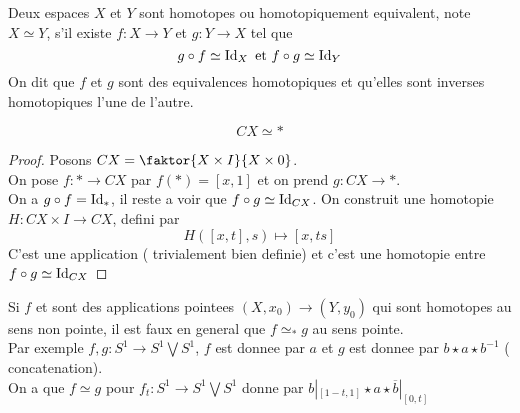 \documentclass[../main.tex]{subfiles}
\begin{document}
\begin{defn}
	Deux espaces $X$ et $Y$ sont homotopes ou homotopiquement equivalent, note $X\simeq Y$, s'il existe $f:X\to Y$ et $g:Y\to X$ tel que
	\[ 
	g\circ f \simeq \operatorname{Id}_X \text{ et } f\circ g \simeq \operatorname{Id}_Y
	\]
	On dit que $f$ et $g$ sont des equivalences homotopiques et qu'elles sont inverses homotopiques l'une de l'autre.
\end{defn}
\begin{propo}
\[ 
CX\simeq \ast
\]

\end{propo}
\begin{proof}
Posons $CX = \faktor { X\times I} { X\times 0} $.\\
On pose $f: \ast \to CX$ par $f( \ast) = [ x,1] $ et on prend $g:CX\to \ast$.\\
On a $g\circ f=\operatorname{Id}_\ast$, il reste a voir que $f\circ g\simeq \operatorname{Id}_{CX} $. On construit une homotopie $H:CX\times I\to CX$, defini par
\[ 
H( [ x,t] ,s) \mapsto [ x,ts] 
\]
C'est une application ( trivialement bien definie) et c'est une homotopie entre $f\circ g\simeq \operatorname{Id}_{CX} $ 
\end{proof}

\begin{rmq}
Si $f$ et sont des applications pointees $( X,x_0) \to ( Y,y_0) $ qui sont homotopes au sens non pointe, il est faux en general que $f\simeq_{\ast} g$ au sens pointe.\\
Par exemple $f,g: S^1\to S^1\bigvee S^1$, $f$ est donnee par $a$ et $g$ est donnee par $b\star a\star b^{-1}$ ( concatenation).\\
On a que $f\simeq g$ pour $f_t: S^1\to S^{1}\bigvee S^{1}$ donne par $b|_{[1-t,1]} \star a \star \overline{b}|_{[0,t]} $ 
\end{rmq}
\end{document}
